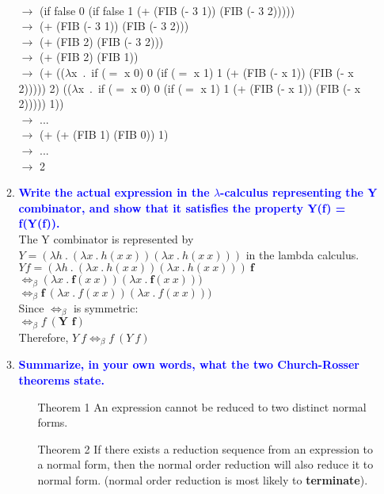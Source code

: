 \documentclass[10pt]{article}
\begin{document}
\begin{enumerate}
\begin{enumerate}
            \\ $\rightarrow$ (if false 0 (if false 1 (+ (FIB (- 3 1)) (FIB (- 3 2)))))
            \\ $\rightarrow$ (+ (FIB (- 3 1)) (FIB (- 3 2)))
            \\ $\rightarrow$ (+ (FIB 2) (FIB (- 3 2)))
            \\ $\rightarrow$ (+ (FIB 2) (FIB 1))
            \\ $\rightarrow$ (+ (($\lambda$x\ .\ if ($=$ x 0) 0 (if ($=$ x 1) 1 (+ (FIB (- x 1)) (FIB (- x 2))))) 2) (($\lambda$x\ .\ if ($=$ x 0) 0 (if ($=$ x 1) 1 (+ (FIB (- x 1)) (FIB (- x 2))))) 1))
            \\ $\rightarrow$ ...
            \\ $\rightarrow$ (+ (+ (FIB 1) (FIB 0)) 1)
            \\ $\rightarrow$ ...
            \\ $\rightarrow$ 2
        \item \textbf{\textcolor{blue}{Write the actual expression in the $\lambda$-calculus representing the Y combinator, and show that it satisfies the property Y(f) = f(Y(f)).}}
            \\ The Y combinator is represented by 
            $Y = (\lambda h\ .\ (\lambda x\ .\ h(x\ x))(\lambda x\ .\ h(x\ x)))$ in the lambda calculus.
            \\ $Y f = (\lambda h\ .\ (\lambda x\ .\ h(x\ x))(\lambda x\ .\ h(x\ x)))\ \textbf{f}$
            \\ $ \Leftrightarrow_\beta (\lambda x\ .\ \textbf{f}(x\ x))(\lambda x\ .\ \textbf{f}(x\ x)))$
            \\ $ \Leftrightarrow_\beta \textbf{f}\ (\lambda x\ .\ f(x\ x))(\lambda x\ .\ f(x\ x)))$
            \\ Since $\Leftrightarrow_\beta$ is symmetric:
            \\ $ \Leftrightarrow_\beta f\ (\textbf{Y f})$
            \\ Therefore, $Y\ f \Leftrightarrow_\beta f\ (Y\ f)$
        \item \textbf{\textcolor{blue}{Summarize, in your own words, what the two Church-Rosser theorems state.}}
            \begin{itemize}
                \item [Theorem 1] An expression cannot be reduced to two distinct normal forms.
                \item [Theorem 2] If there exists a reduction sequence from an expression to a normal form, then the normal order reduction will also reduce it to normal form. (normal order reduction is most likely to \textbf{terminate}).
            \end{itemize}
    \end{enumerate}
    

\end{enumerate}
\end{document}
